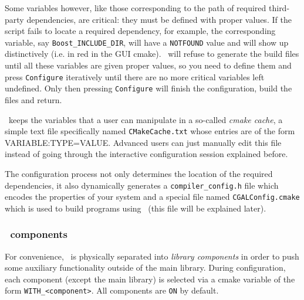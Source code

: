 Some variables however, like those corresponding to the path of required third-party dependencies, are critical: they 
must be defined with proper values. If the script fails to locate a required dependency, for example, the corresponding variable,
say \texttt{Boost\_INCLUDE\_DIR}, will have a \texttt{NOTFOUND} value and will show up distinctively (i.e. in red in the GUI cmake).
\cmake\ will refuse to generate the build files until all these variables are given proper values, so you need
to define them and press \texttt{Configure} iteratively until there are no more critical variables left undefined. Only then
pressing \texttt{Configure} will finish the configuration, build the files and return.

\begin{ccAdvanced}
\cmake\ keeps the variables that a user can manipulate in a so-called {\em cmake cache}, a simple text file specifically 
named \texttt{CMakeCache.txt} whose entries are of the form VARIABLE:TYPE=VALUE. Advanced users can just manually edit this 
file instead of going through the interactive configuration session explained before.
\end{ccAdvanced}


The configuration process not only determines the location of the required dependencies, it also dynamically generates a
\texttt{compiler\_config.h} file which encodes the properties of your system and a special file named 
\texttt{CGALConfig.cmake} which is used to build programs using \cgal\ (this file will be explained later).

\subsubsection{\cgal\ components}

For convenience, \cgal\ is physically separated into {\em library components} in order to push some auxiliary 
functionality outside of the main library. During configuration, each component (except the main library) is selected 
via a cmake variable of the form {\tt WITH\_<component>}. All components are {\tt ON} by default.

